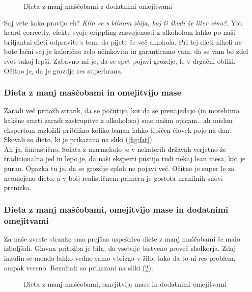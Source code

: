 \documentclass[a4paper]{article}
\begin{document}
\begin{figure}[H]
    \centering
    \caption{Dieta z manj maščobami z dodatnimi omejitvami}
    \label{fig:fat-add-no-mass}
\end{figure}

Saj vete kako pravijo eh? \textit{Klin se s klinom zbija, kaj ti škodi še liter vina?}. You heard 
correctly, efekte svoje crippling zasvojenosti z alkoholom lahko po naši briljantni dieti odpravite
s tem, da pijete še več alkohola. Pri tej dieti nikoli ne bote lačni saj je kalorično zelo učinkovita 
in garantiramo vam, da se vam bo zdel svet takoj lepši. Zabavno mi je, da se spet pojavi grozdje, le 
v drgačni obliki. Očitno je, da je grozdje res superhrana.\\

\subsubsection{Dieta z manj maščobami in omejitvijo mase}
Zaradi več pritožb strank, da se počutijo, kot da se prenajedajo (in morebitno kakšne smrti zaradi
zastrupitve z alkoholom) smo našim opicam.. ah mislim ekspertom razložili približno koliko banan lahko
tipičen človek poje na dan. Skovali so dieto, ki je prikazana na sliki (\ref{fig:fat}). \\



Ah ja, fantastično. Solata z marmelado je v nekaterih državah verjetno že tradicionalna jed in lepo je, 
da naši eksperti pustijo tudi nekaj lean mesa, kot je puran. Opazka tu je, da se grozdje sploh ne pojavi več.
Očitno je super le za neomejeno dieto, a v bolj realističnem primeru je gostota hranilnih snovi prenizka. \\

\subsubsection{Dieta z manj maščobami, omejitvijo mase in dodatnimi omejitvami}
Za naše zveste stranke smo prejšno uspešnico diete z manj maščobami še malo izboljšali. Glavna pritožba
je bila, da vsebuje bistveno preveč sladkorja. Zdaj inzulin se menda lahko vedno samo vbrizga v žilo,
tako da to ni res problem, ampak vseeno. Rezultati so prikazani na sliki (\ref{fig:fat-add}). \\

\begin{figure}[H]
    \centering
    \caption{Dieta z manj maščobami, omejitvijo mase in dodatnimi omejitvami}
    \label{fig:fat-add}
\end{figure}
\end{document}
